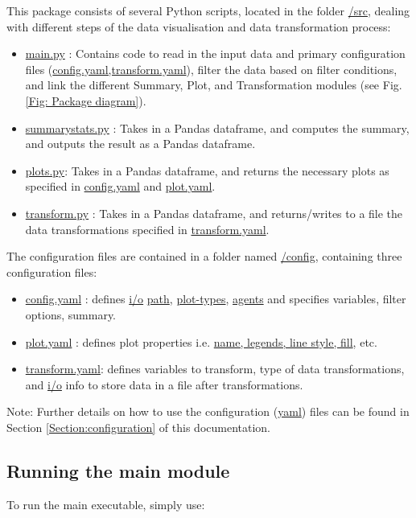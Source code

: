 \documentclass[10pt,a4paper]{article}
\begin{document}
This package consists of several Python scripts, located in the folder \url{/src}, dealing with different steps of the data visualisation and data transformation process:
\begin{itemize}
\item \url{main.py} : Contains code to read in the input data and primary configuration files (\url{config.yaml,transform.yaml}), filter the data based on filter conditions, and link the different Summary, Plot, and Transformation modules (see Fig. \ref{Fig: Package diagram}).

\item \url{summarystats.py} : Takes in a Pandas dataframe, and computes the summary, and outputs the result as a Pandas dataframe.

\item \url{plots.py}: Takes in a Pandas dataframe, and returns the necessary plots as specified in \url{config.yaml} and \url{plot.yaml}.

\item \url{transform.py} : Takes in a Pandas dataframe, and returns/writes to a file the data transformations specified in \url{transform.yaml}.
\end{itemize}

The configuration files are contained in a folder named \url{/config}, containing three configuration files:
\begin{itemize}
\item \url{config.yaml} : defines \url{i/o} \url{path}, \url{plot-types}, \url{agents} and specifies variables, filter options, summary.

\item \url{plot.yaml} : defines plot properties i.e. \url{name, legends, line style, fill}, etc.

\item \url{transform.yaml}: defines variables to transform, type of data transformations, and \url{i/o} info to store data in a file after transformations.
\end{itemize}

Note: Further details on how to use the configuration (\url{yaml}) files can be found in Section \ref{Section:configuration} of this documentation.

\subsection{Running the main module}

To run the main executable, simply use:
\end{document}
